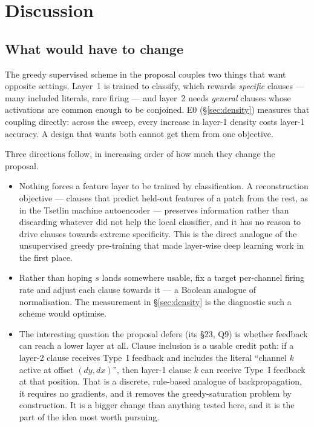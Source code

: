 \section{Discussion}
\label{sec:discussion}



\subsection{What would have to change}

The greedy supervised scheme in the proposal couples two things that want opposite settings.
Layer~1 is trained to classify, which rewards \emph{specific} clauses --- many included
literals, rare firing --- and layer~2 needs \emph{general} clauses whose activations are
common enough to be conjoined. E0 (\S\ref{sec:density}) measures that coupling directly:
across the sweep, every increase in layer-1 density costs layer-1 accuracy. A design that
wants both cannot get them from one objective.

Three directions follow, in increasing order of how much they change the proposal.

\begin{itemize}[leftmargin=1.2em]
\item {} Nothing forces a feature layer to be trained
  by classification. A reconstruction objective --- clauses that predict held-out features of
  a patch from the rest, as in the Tsetlin machine autoencoder --- preserves information
  rather than discarding whatever did not help the local classifier, and it has no reason to
  drive clauses towards extreme specificity. This is the direct analogue of the unsupervised
  greedy pre-training that made layer-wise deep learning work in the first place.
\item {} Rather than hoping $s$ lands somewhere usable, fix
  a target per-channel firing rate and adjust each clause towards it --- a Boolean analogue of
  normalisation. The measurement in \S\ref{sec:density} is the diagnostic such a scheme would
  optimise.
\item {} The interesting question the proposal
  defers (its \S23, Q9) is whether feedback can reach a lower layer at all. Clause inclusion
  is a usable credit path: if a layer-2 clause receives Type~I feedback and includes the
  literal ``channel $k$ active at offset $(dy,dx)$'', then layer-1 clause $k$ can receive
  Type~I feedback at that position. That is a discrete, rule-based analogue of
  backpropagation, it requires no gradients, and it removes the greedy-saturation problem by
  construction. It is a bigger change than anything tested here, and it is the part of the
  idea most worth pursuing.
\end{itemize}

